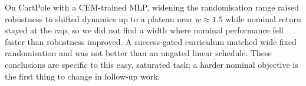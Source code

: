 On CartPole with a CEM-trained MLP, widening the randomisation range raised robustness to shifted dynamics up to a plateau near $w\approx1.5$ while nominal return stayed at the cap, so we did not find a width where nominal performance fell faster than robustness improved. A success-gated curriculum matched wide fixed randomisation and was not better than an ungated linear schedule. These conclusions are specific to this easy, saturated task; a harder nominal objective is the first thing to change in follow-up work.
